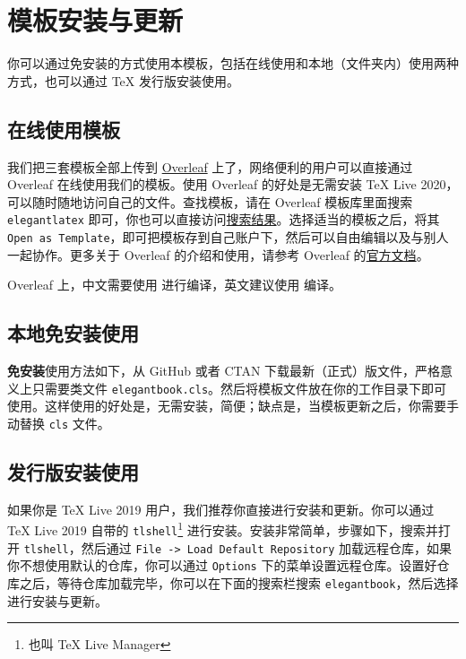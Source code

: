 \documentclass[cn,11pt]{elegantbook}
\begin{document}
\section{模板安装与更新}

你可以通过免安装的方式使用本模板，包括在线使用和本地（文件夹内）使用两种方式，也可以通过 \TeX{} 发行版安装使用。

\subsection{在线使用模板}

我们把三套模板全部上传到 \href{https://www.overleaf.com/}{Overleaf} 上了，网络便利的用户可以直接通过 Overleaf 在线使用我们的模板。使用 Overleaf 的好处是无需安装 \TeX{} Live 2020，可以随时随地访问自己的文件。查找模板，请在 Overleaf 模板库里面搜索 \lstinline{elegantlatex} 即可，你也可以直接访问\href{https://www.overleaf.com/latex/templates?addsearch=elegantlatex}{搜索结果}。选择适当的模板之后，将其 \lstinline{Open as Template}，即可把模板存到自己账户下，然后可以自由编辑以及与别人一起协作。更多关于 Overleaf 的介绍和使用，请参考 Overleaf 的\href{https://www.overleaf.com/learn}{官方文档}。

\begin{remark}
Overleaf 上，中文需要使用  进行编译，英文建议使用  编译。
\end{remark}

\subsection{本地免安装使用}


\textbf{免安装}使用方法如下，从 GitHub 或者 CTAN 下载最新（正式）版文件，严格意义上只需要类文件 \lstinline{elegantbook.cls}。然后将模板文件放在你的工作目录下即可使用。这样使用的好处是，无需安装，简便；缺点是，当模板更新之后，你需要手动替换 \lstinline{cls} 文件。

\subsection{发行版安装使用}

如果你是 \TeX{} Live 2019 用户，我们推荐你直接进行安装和更新。你可以通过 \TeX{} Live 2019 自带的 \lstinline{tlshell}\footnote{也叫 \TeX{} Live Manager} 进行安装。安装非常简单，步骤如下，搜索并打开 \lstinline{tlshell}，然后通过 \lstinline{File -> Load Default Repository} 加载远程仓库，如果你不想使用默认的仓库，你可以通过 \lstinline{Options} 下的菜单设置远程仓库。设置好仓库之后，等待仓库加载完毕，你可以在下面的搜索栏搜索 \lstinline{elegantbook}，然后选择进行安装与更新。
\end{document}
